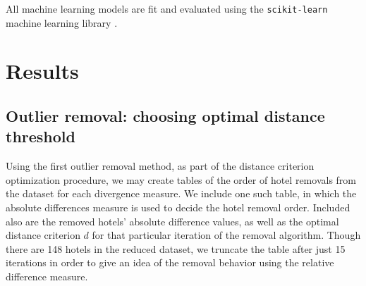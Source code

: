 \documentclass[useAMS, usenatbib]{biom}
\begin{document}
All machine learning models are fit and evaluated using the \texttt{scikit-learn} machine learning library \citep{scikit-learn}.

\section{Results}
\label{s:results}

\subsection{Outlier removal: choosing optimal distance threshold}
\label{ss:optimization}

Using the first outlier removal method, as part of the distance criterion optimization procedure, we may create tables of the order of hotel removals from the dataset for each divergence measure. We include one such table, in which the absolute differences measure is used to decide the hotel removal order. Included also are the removed hotels' absolute difference values, as well as the optimal distance criterion $d$ for that particular iteration of the removal algorithm. Though there are 148 hotels in the reduced dataset, we truncate the table after just 15 iterations in order to give an idea of the removal behavior using the relative difference measure.
\end{document}
